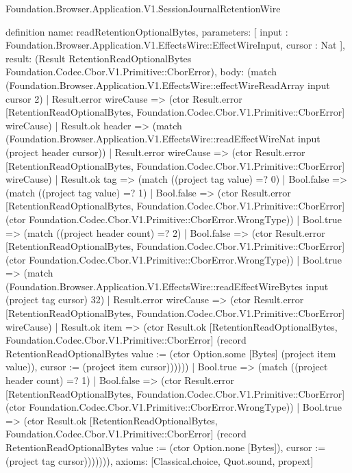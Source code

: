 \begin{lexlean}{Foundation.Browser.Application.V1.SessionJournalRetentionWire}
\begin{semanticmodule}
definition{
  name: readRetentionOptionalBytes,
  parameters: [
    input : Foundation.Browser.Application.V1.EffectsWire::EffectWireInput,
    cursor : Nat
  ],
  result: (Result RetentionReadOptionalBytes Foundation.Codec.Cbor.V1.Primitive::CborError),
  body: (match (Foundation.Browser.Application.V1.EffectsWire::effectWireReadArray input cursor 2)
    | Result.error wireCause => (ctor Result.error [RetentionReadOptionalBytes, Foundation.Codec.Cbor.V1.Primitive::CborError] wireCause)
    | Result.ok header => (match (Foundation.Browser.Application.V1.EffectsWire::readEffectWireNat input (project header cursor))
      | Result.error wireCause => (ctor Result.error [RetentionReadOptionalBytes, Foundation.Codec.Cbor.V1.Primitive::CborError] wireCause)
      | Result.ok tag => (match ((project tag value) =? 0)
        | Bool.false => (match ((project tag value) =? 1)
          | Bool.false => (ctor Result.error [RetentionReadOptionalBytes, Foundation.Codec.Cbor.V1.Primitive::CborError] (ctor Foundation.Codec.Cbor.V1.Primitive::CborError.WrongType))
          | Bool.true => (match ((project header count) =? 2)
            | Bool.false => (ctor Result.error [RetentionReadOptionalBytes, Foundation.Codec.Cbor.V1.Primitive::CborError] (ctor Foundation.Codec.Cbor.V1.Primitive::CborError.WrongType))
            | Bool.true => (match (Foundation.Browser.Application.V1.EffectsWire::readEffectWireBytes input (project tag cursor) 32)
              | Result.error wireCause => (ctor Result.error [RetentionReadOptionalBytes, Foundation.Codec.Cbor.V1.Primitive::CborError] wireCause)
              | Result.ok item => (ctor Result.ok [RetentionReadOptionalBytes, Foundation.Codec.Cbor.V1.Primitive::CborError] (record RetentionReadOptionalBytes {value := (ctor Option.some [Bytes] (project item value)), cursor := (project item cursor)})))))
        | Bool.true => (match ((project header count) =? 1)
          | Bool.false => (ctor Result.error [RetentionReadOptionalBytes, Foundation.Codec.Cbor.V1.Primitive::CborError] (ctor Foundation.Codec.Cbor.V1.Primitive::CborError.WrongType))
          | Bool.true => (ctor Result.ok [RetentionReadOptionalBytes, Foundation.Codec.Cbor.V1.Primitive::CborError] (record RetentionReadOptionalBytes {value := (ctor Option.none [Bytes]), cursor := (project tag cursor)})))))),
  axioms: [Classical.choice, Quot.sound, propext]
}


\end{semanticmodule}
\end{lexlean}
